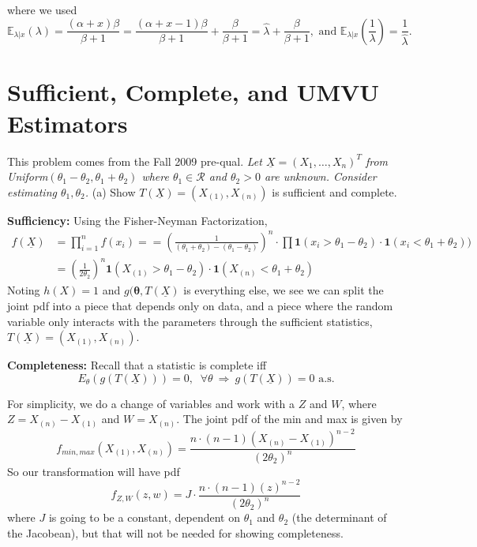 \documentclass[11pt]{report}
\begin{document}
where we used 
$$\mathbb{E}_{\lambda|x}\left(\lambda\right) = \frac{(\alpha +x)\beta}{\beta+1} = \frac{(\alpha +x - 1)\beta}{\beta+1} + \frac{\beta}{\beta+1} = \widehat{\lambda} + \frac{\beta}{\beta+1},\text{ and } \mathbb{E}_{\lambda|x}\left(\frac{1}{\lambda}\right) = \frac{1}{\widehat{\lambda}}. $$

\chapter{Sufficient, Complete, and UMVU Estimators}
This problem comes from the Fall 2009 pre-qual. 
\emph{
Let $\underline{X} = (X_1, \dots, X_n)^T$ from Uniform$(\theta_1-\theta_2, \theta_1+\theta_2)$ where $\theta_1 \in \mathcal{R}$ and $\theta_2 > 0$ are unknown. Consider estimating $\theta_1, \theta_2$. }
\newline
(a) Show $T(\underline{X}) = (X_{(1)}, X_{(n)})$ is sufficient and complete.

\textbf{Sufficiency:} Using the Fisher-Neyman Factorization,
\begin{align*}
f(\underline{X}) &= \prod_{i=1}^n f(x_i) = 
 = \left( \frac{1}{(\theta_1+\theta_2) - (\theta_1-\theta_2)} \right)^n
\cdot \prod \mathbf{1}(x_i > \theta_1-\theta_2) \cdot \mathbf{1}( x_i < \theta_1+\theta_2) ) \\
&= \left( \frac{1}{2 \theta_2} \right)^n \mathbf{1}( { X_{(1)} > \theta_1-\theta_2}) \cdot \mathbf{1}( X_{(n)} < \theta_1 + \theta_2)
\end{align*}
Noting $h(X) = 1$ and $g(\mathbf{\theta}, T(\underline{X})$ is everything else, we see we can split the joint pdf into a piece that depends only on data, and a piece where the random variable only interacts with the parameters through the sufficient statistics, $T(\underline{X}) = (X_{(1)}, X_{(n)})$. 

\textbf{Completeness:} Recall that a statistic is complete iff 
\[ E_\theta(g(T(\underline{X}))) = 0, \;\; \forall \theta\ \Rightarrow\  g(T(\underline{X})) = 0 \text{ a.s.} \]

For simplicity, we do a change of variables and work with a $Z$ and $W$, where $Z = X_{(n)} - X_{(1)}$ and $W = X_{(n)}$.
 The joint pdf of the min and max is given by
\[ f_{min, max} (X_{(1)}, X_{(n)}) = \frac{n \cdot (n-1) (X_{(n)} - X_{(1)})^{n-2}}{\left( 2 \theta_2 \right)^n} \]
So our transformation will have pdf
\[ f_{Z, W} (z, w) = J \cdot \frac{n \cdot (n-1) (z)^{n-2}}{\left( 2 \theta_2 \right)^n} \]
where $J$ is going to be a constant, dependent on $\theta_1$ and $\theta_2$ (the determinant of the Jacobean), but that will not be needed for showing completeness.
\end{document}
